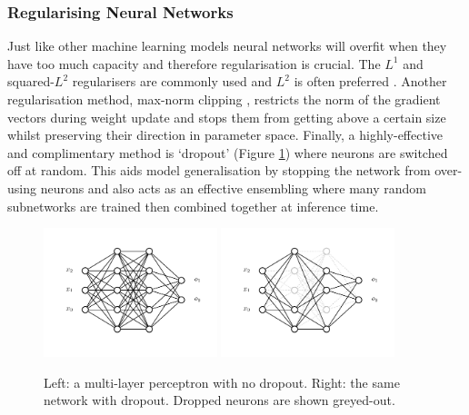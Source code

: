 \subsubsection{Regularising Neural Networks}
Just like other machine learning models neural networks will overfit when they have too much capacity and therefore regularisation is crucial. The $L^{1}$ and squared-$L^{2}$ regularisers are commonly used and $L^{2}$ is often preferred \cite{CS231n}. Another regularisation method, max-norm clipping \cite{CS231n}, restricts the norm of the gradient vectors during weight update and stops them from getting above a certain size whilst preserving their direction in parameter space. Finally, a highly-effective and complimentary method is `dropout' \cite{Dropout} (Figure \ref{fig:machine_learning:dropout})  where neurons are switched off at random. This aids model generalisation by stopping the network from over-using neurons and also acts as an effective ensembling where many random subnetworks are trained then combined together at inference time.  
\begin{figure}[h!]
    \begin{center}
        \includegraphics[width=0.45\textwidth]{figures/machine_learning/no_dropout.pdf}
        \includegraphics[width=0.45\textwidth]{figures/machine_learning/dropout.pdf}
    \end{center}
    \caption{Left: a multi-layer perceptron with no dropout. Right: the same network with dropout. Dropped neurons are shown greyed-out.}
        \label{fig:machine_learning:dropout}
\end{figure}

